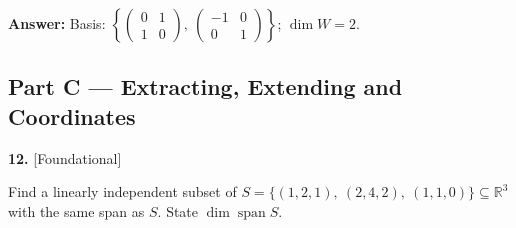 \documentclass[11pt]{article}
\begin{document}
\begin{tcolorbox}[breakable,colback=ans,colframe=ansb,boxrule=0.5pt,left=4pt,right=4pt,top=2pt,bottom=2pt]
\begin{enumerate}[leftmargin=3.1em,itemsep=1pt,topsep=1pt,label=\textbf{Step \arabic*.}]
\end{enumerate}\textbf{Answer:} Basis: $\left\{\begin{pmatrix}0 & 1 \\ 1 & 0\end{pmatrix},\ \begin{pmatrix}-1 & 0 \\ 0 & 1\end{pmatrix}\right\}$; $\dim W=2$.\end{tcolorbox}
\par\vspace{2pt}
\subsection*{\normalsize\color{ink} Part C --- Extracting, Extending and Coordinates}
\begin{minipage}{\linewidth}\textbf{12.} \hfill{\scriptsize\color{ink}[Foundational]}\par\nopagebreak Find a linearly independent subset of $S=\{(1,2,1),\ (2,4,2),\ (1,1,0)\}\subseteq\mathbb{R}^{3}$ with the same span as $S$. State $\dim\operatorname{span}S$.
\end{minipage}\par\nopagebreak
\end{document}
